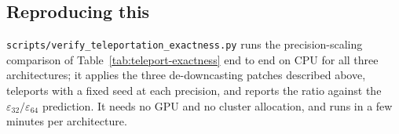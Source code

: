 



\subsection{Reproducing this}
\label{app:teleport-repro}

\texttt{scripts/verify\_teleportation\_exactness.py} runs the precision-scaling
comparison of Table~\ref{tab:teleport-exactness} end to end on CPU for all three
architectures; it applies the three de-downcasting patches described above,
teleports with a fixed seed at each precision, and reports the ratio against the
$\varepsilon_{32}/\varepsilon_{64}$ prediction. It needs no GPU and no cluster
allocation, and runs in a few minutes per architecture.
